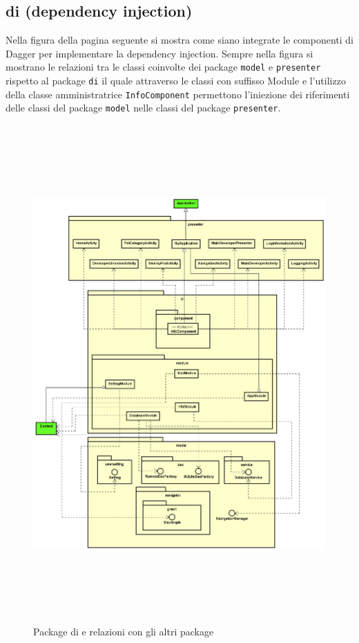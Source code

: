\documentclass[../DefinizioneDiProdotto.tex,lanscape]{subfiles}
\begin{document}
\newpage
	\subsection{di (dependency injection)}
		Nella figura della pagina seguente si mostra come siano integrate le componenti di Dagger per implementare la dependency injection. Sempre nella figura si mostrano le relazioni tra le classi coinvolte dei package \verb|model| e \verb|presenter| rispetto al package \verb|di| il quale attraverso le classi con suffisso Module e l'utilizzo della classe amministratrice \verb|InfoComponent| permettono l'iniezione dei riferimenti delle classi del package \verb|model| nelle classi del package \verb|presenter|.
	
	
\begin{figure}[p]
	\centering
	\includegraphics[height=19cm,width=\textwidth]{diagrams/ModelCompleteNoMethods/PNGpackage/di}
	\caption{Package di e relazioni con gli altri package}
	\label{diPackage}
\end{figure}
\end{document}

